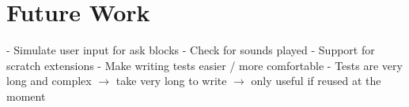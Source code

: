 \chapter{Future Work}
- Simulate user input for ask blocks
- Check for sounds played
- Support for scratch extensions
- Make writing tests easier / more comfortable
    - Tests are very long and complex
    $\rightarrow$ take very long to write $\rightarrow$ only useful if reused at the moment
